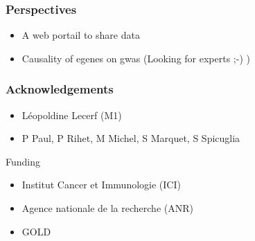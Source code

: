 \documentclass{beamer}
\begin{document}
\begin{frame}
\frametitle{Perspectives}


\begin{itemize}
\item A web portail to share data
\item Causality of egenes on gwas (Looking for experts ;-) )
\end{itemize}

\end{frame}

\begin{frame}
\frametitle{Acknowledgements}

\begin{itemize}
\item L\'eopoldine Lecerf (M1)
\item P Paul, P Rihet, M Michel, S Marquet, S Spicuglia
\end{itemize}
%
\vfill
%
Funding
%
\begin{itemize}
\item Institut Cancer et Immunologie (ICI)
\item Agence nationale de la recherche (ANR)
\item GOLD
\end{itemize}

\end{frame}
\end{document}
